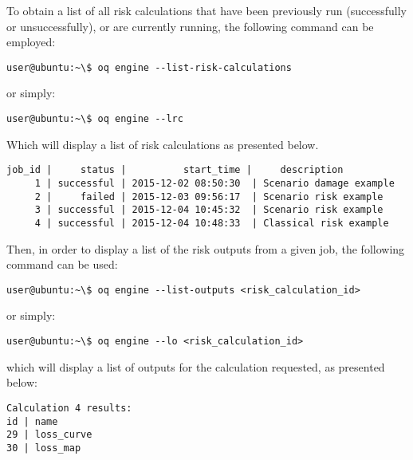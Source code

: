 To obtain a list of all risk calculations that have been previously run
(successfully or unsuccessfully), or are currently running, the following
command can be employed:

\begin{verbatim}
user@ubuntu:~\$ oq engine --list-risk-calculations
\end{verbatim}

or simply:

\begin{verbatim}
user@ubuntu:~\$ oq engine --lrc
\end{verbatim}

Which will display a list of risk calculations as presented below.

\begin{verbatim}
job_id |     status |          start_time |     description
     1 | successful | 2015-12-02 08:50:30  | Scenario damage example
     2 |     failed | 2015-12-03 09:56:17  | Scenario risk example
     3 | successful | 2015-12-04 10:45:32  | Scenario risk example
     4 | successful | 2015-12-04 10:48:33  | Classical risk example
\end{verbatim}

Then, in order to display a list of the risk outputs from a given job, the
following command can be used:

\begin{verbatim}
user@ubuntu:~\$ oq engine --list-outputs <risk_calculation_id>
\end{verbatim}

or simply:

\begin{verbatim}
user@ubuntu:~\$ oq engine --lo <risk_calculation_id>
\end{verbatim}

which will display a list of outputs for the calculation requested, as
presented below:

\begin{verbatim}
Calculation 4 results:
id | name
29 | loss_curve
30 | loss_map
\end{verbatim}

